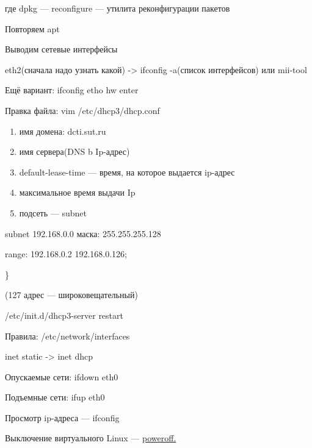 \par 
где dpkg — reconfigure — утилита реконфигурации
пакетов
\par 
Повторяем apt
\par 
Выводим сетевые интерфейсы
\par eth2(сначала
надо узнать какой)  ->
ifconfig -a(список интерфейсов) или mii-tool
\par 
Ещё вариант: ifconfig etho hw enter
\par 
Правка файла: vim /etc/dhcp3/dhcp.conf
\begin{enumerate}
	\item \par 
	имя домена: dcti.sut.ru
	\item \par 
	имя сервера(DNS b Ip-адрес)
	\item \par 
	default-lease-time — время, на которое выдается
	ip-адрес
	\item \par 
	максимальное время выдачи Ip
	\item \par 
	подсеть — subnet
\end{enumerate}
\par 
subnet 192.168.0.0 маска: 255.255.255.128
\par 
range: 192.168.0.2  192.168.0.126;
\par 
\}
\par 
(127 адрес — широковещательный)
\par 
/etc/init.d/dhcp3-server restart
\par 
Правила: /etc/network/interfaces
\par inet
static -> 
inet dhcp
\par 
Опускаемые сети: ifdown eth0
\par 
Подъемные сети: ifup eth0
\par 
Просмотр ip-адреса — ifconfig
\par Выключение
виртуального Linux — \underline{poweroff.}
\par 


